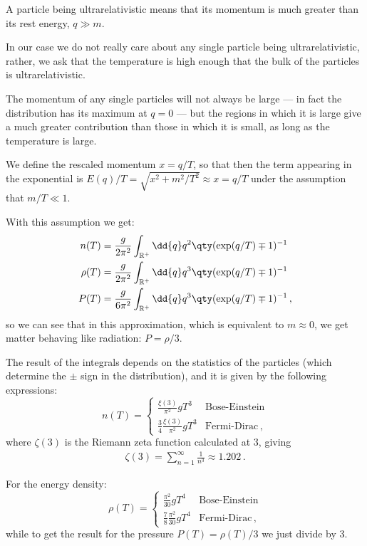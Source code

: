 \documentclass[main.tex]{subfiles}
\begin{document}
A particle being ultrarelativistic means that its momentum is much greater than its rest energy, \(q \gg m\).

In our case we do not really care about any single particle being ultrarelativistic, rather, we ask that the temperature is high enough that the bulk of the particles is ultrarelativistic. 

The momentum of any single particles will not always be large --- in fact the distribution has its maximum at \(q = 0\) --- but the regions in which it is large give a much greater contribution than those in which it is small, as long as the temperature is large.

We define the rescaled momentum \(x = q/T\), so that then the term appearing in the exponential is \(E(q) / T = \sqrt{x^2+ m^2/T^2} \approx x = q/ T \) under the assumption that \(m / T \ll 1\). 


With this assumption we get:
%
\begin{align}
  n(T) &= \frac{g}{2 \pi^2} \int _{\mathbb{R}^{+}} \dd{q} q^2 \qty(\exp(q/T) \mp 1 )^{-1} \\
  \rho (T) &= \frac{g}{2 \pi^2} \int _{\mathbb{R}^{+}} \dd{q} q^3 \qty(\exp(q/T) \mp 1 )^{-1}  \\
  P (T) &= \frac{g}{6 \pi^2} \int _{\mathbb{R}^{+}} \dd{q} q^3 \qty(\exp(q/T) \mp 1 )^{-1} 
\,,
\end{align}
%
so we can see that in this approximation, which is equivalent to \(m \approx 0\), we get matter behaving like radiation: \(P = \rho /3\).  

The result of the integrals depends on the statistics of the particles (which determine the \(\pm\) sign in the distribution), and it is given by the following expressions:
%
\begin{equation}
  n(T) = \begin{cases}
      \displaystyle
      \frac{\xi (3)}{\pi^2} g T^3 & \text{Bose-Einstein}  \\[10pt]
      \displaystyle
      \frac{3}{4}\frac{\xi (3)}{\pi^2} g T^3 & \text{Fermi-Dirac}
  \,,
  \end{cases}
\end{equation}
%
where \(\zeta (3)\) is the Riemann zeta function calculated at 3, giving 
%
\begin{align}
\zeta (3) = \sum _{n=1}^{\infty } \frac{1}{n^3} \approx \num{1.202}
\,.
\end{align}
%

For the energy density:
\begin{equation}
    \rho (T) = \begin{cases}
        \displaystyle
        \frac{\pi^2}{30} g T^4 & \text{Bose-Einstein}  \\[10pt]
        \displaystyle
        \frac{7}{8}\frac{\pi^2}{30} g T^4 & \text{Fermi-Dirac}  
    \,,
    \end{cases}
\end{equation}
while to get the result for the pressure \(P(T) = \rho (T) / 3\) we just divide by 3.
\end{document}
